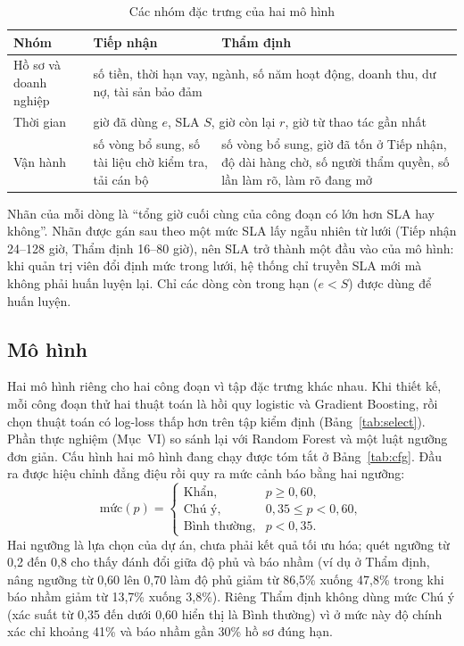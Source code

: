 \documentclass[journal]{IEEEtran}
\begin{document}
\begin{table}[t]
\caption{Các nhóm đặc trưng của hai mô hình}
\label{tab:feat}
\centering
\small
\begin{tabular}{|p{}|p{}|p{}|}
\hline
Nhóm & Tiếp nhận & Thẩm định \\
\hline
Hồ sơ và doanh nghiệp & \multicolumn{2}{p{0.68\columnwidth}|}{số tiền, thời hạn vay, ngành, số năm hoạt động, doanh thu, dư nợ, tài sản bảo đảm} \\
\hline
Thời gian & \multicolumn{2}{p{0.68\columnwidth}|}{giờ đã dùng $e$, SLA $S$, giờ còn lại $r$, giờ từ thao tác gần nhất} \\
\hline
Vận hành & số vòng bổ sung, số tài liệu chờ kiểm tra, tải cán bộ & số vòng bổ sung, giờ đã tốn ở Tiếp nhận, độ dài hàng chờ, số người thẩm quyền, số lần làm rõ, làm rõ đang mở \\
\hline
\end{tabular}
\end{table}

Nhãn của mỗi dòng là ``tổng giờ cuối cùng của công đoạn có lớn hơn SLA hay không''. Nhãn được gán sau theo một mức SLA lấy ngẫu nhiên từ lưới (Tiếp nhận 24--128 giờ, Thẩm định 16--80 giờ), nên SLA trở thành một đầu vào của mô hình: khi quản trị viên đổi định mức trong lưới, hệ thống chỉ truyền SLA mới mà không phải huấn luyện lại. Chỉ các dòng còn trong hạn ($e<S$) được dùng để huấn luyện.

\subsection{Mô hình}
Hai mô hình riêng cho hai công đoạn vì tập đặc trưng khác nhau. Khi thiết kế, mỗi công đoạn thử hai thuật toán là hồi quy logistic và Gradient Boosting, rồi chọn thuật toán có log-loss thấp hơn trên tập kiểm định (Bảng~\ref{tab:select}). Phần thực nghiệm (Mục~VI) so sánh lại với Random Forest và một luật ngưỡng đơn giản. Cấu hình hai mô hình đang chạy được tóm tắt ở Bảng~\ref{tab:cfg}. Đầu ra được hiệu chỉnh đẳng điệu rồi quy ra mức cảnh báo bằng hai ngưỡng:
\begin{equation}
\text{mức}(p)=\begin{cases}
\text{Khẩn}, & p\ge 0{,}60,\\
\text{Chú ý}, & 0{,}35\le p<0{,}60,\\
\text{Bình thường}, & p<0{,}35.
\end{cases}
\end{equation}
Hai ngưỡng là lựa chọn của dự án, chưa phải kết quả tối ưu hóa; quét ngưỡng từ 0,2 đến 0,8 cho thấy đánh đổi giữa độ phủ và báo nhầm (ví dụ ở Thẩm định, nâng ngưỡng từ 0,60 lên 0,70 làm độ phủ giảm từ 86,5\% xuống 47,8\% trong khi báo nhầm giảm từ 13,7\% xuống 3,8\%). Riêng Thẩm định không dùng mức Chú ý (xác suất từ 0,35 đến dưới 0,60 hiển thị là Bình thường) vì ở mức này độ chính xác chỉ khoảng 41\% và báo nhầm gần 30\% hồ sơ đúng hạn.
\end{document}

